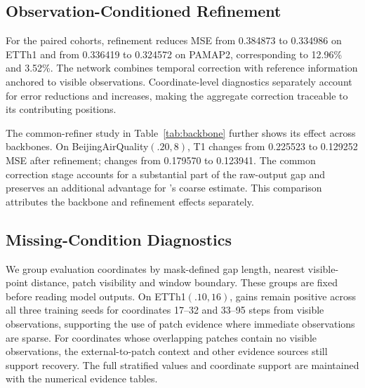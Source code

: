 \begin{table}[t]
 \centering\small\setlength{\tabcolsep}{3pt}
 
 \caption{Component and retrieval controls, after refinement. ETTh1 uses three training seeds (mean$\pm$sample SD); PAMAP2 component rows consistently use seed 2023. Every model is evaluated on twenty shared masks. Three-seed PAMAP2 results for \Model{} and the matched context-only model are given separately in Table~\ref{tab:core}.}
 \label{tab:components}
\end{table}

\subsection{Observation-Conditioned Refinement}
For the paired \Model{} cohorts, refinement reduces MSE from 0.384873 to 0.334986 on ETTh1 and from 0.336419 to 0.324572 on PAMAP2, corresponding to 12.96\% and 3.52\%. The network combines temporal correction with reference information anchored to visible observations. Coordinate-level diagnostics separately account for error reductions and increases, making the aggregate correction traceable to its contributing positions.

The common-refiner study in Table~\ref{tab:backbone} further shows its effect across backbones. On BeijingAirQuality$(.20,8)$, T1 changes from 0.225523 to 0.129252 MSE after refinement; \Model{} changes from 0.179570 to 0.123941. The common correction stage accounts for a substantial part of the raw-output gap and preserves an additional advantage for \Model's coarse estimate. This comparison attributes the backbone and refinement effects separately.

\begin{table}[t]
 \centering\small\setlength{\tabcolsep}{3pt}
 
 \caption{A common refinement architecture applied to three frozen backbones on BeijingAirQuality$(.20,8)$, seed 2023, twenty test masks. Coarse and refined errors are evaluated on the same positions.}
 \label{tab:backbone}
\end{table}

\subsection{Missing-Condition Diagnostics}
We group evaluation coordinates by mask-defined gap length, nearest visible-point distance, patch visibility and window boundary. These groups are fixed before reading model outputs. On ETTh1$(.10,16)$, gains remain positive across all three training seeds for coordinates 17--32 and 33--95 steps from visible observations, supporting the use of patch evidence where immediate observations are sparse. For coordinates whose overlapping patches contain no visible observations, the external-to-patch context and other evidence sources still support recovery. The full stratified values and coordinate support are maintained with the numerical evidence tables.

